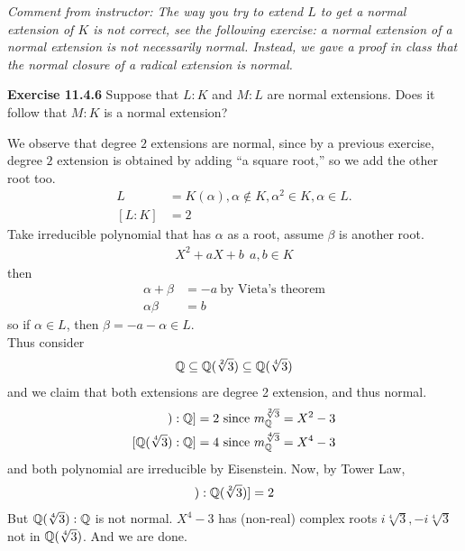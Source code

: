 \documentclass{article}
\begin{document}
\begin{homeworkProblem}
    \textit{Comment from instructor: The way you try to extend $L$ to get a normal
    extension of $K$ is not correct, see the following exercise: a normal extension
    of a normal extension is not necessarily normal.
    Instead, we gave a proof in class that 
    the normal closure of a radical extension is normal.}


\end{homeworkProblem}

\pagebreak


\begin{homeworkProblem}
    \textbf{Exercise 11.4.6} Suppose that $L:K$ and $M:L$ are normal extensions.
    Does it follow that $M:K$ is a normal extension?\\
    \solution 

    We observe that degree $2$ extensions are normal,
    since by a previous exercise, degree $2$ extension is obtained
    by adding ``a square root,'' so we add the other root too.
    \begin{align}
        L &= K(\alpha), \alpha \notin K, \alpha^2 \in K, \alpha \in L. \\ 
        [L:K] &= 2
    \end{align}
    Take irreducible polynomial that has $\alpha$ as a root, assume $\beta$ is another root. 
    \begin{align}
        X^2 + a X + b \ \  a,b \in K
    \end{align}
    then 
    \begin{align}
        \alpha + \beta &= -a \ \text{by Vieta's theorem} \\
        \alpha \beta &= b
    \end{align}
    so if $\alpha \in L$, then $\beta = -a -\alpha \in L$.\\

    Thus consider
    \begin{align}
        \mathbb{Q} \subseteq \mathbb{Q} (\sqrt[2]{3}) \subseteq \mathbb{Q}(\sqrt[4]{3})
    \end{align}
    and we claim that both extensions are degree 2 extension, and thus normal.\\
    \begin{align}
        [\Q(\sqrt[2]{3}) : \Q] &= 2 \ \text{since} \ m_{\Q}^{\sqrt[2]{3}} = X^2 - 3\\
        [\Q(\sqrt[4]{3}) : \Q] &= 4 \ \text{since} \ m_{\Q}^{\sqrt[4]{3}} = X^4 - 3\\
    \end{align}
    and both polynomial are irreducible by Eisenstein. Now, by Tower Law,
    \begin{align}
        [\Q (\sqrt[4]{3}) : \Q(\sqrt[2]{3})] = 2
    \end{align}
    But $\mathbb{Q}(\sqrt[4]{3}) : \mathbb{Q}$ is not normal. $X^4 - 3$ has (non-real) complex roots
    $i \sqrt[4]{3}, - i \sqrt[4]{3}$ not in $\mathbb{Q}(\sqrt[4]{3})$. And we are done.
    


\end{homeworkProblem}
\end{document}
